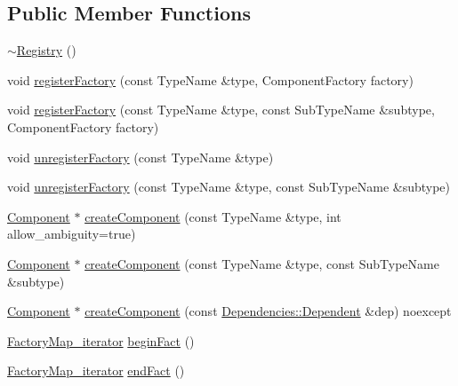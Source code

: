 \subsection*{Public Member Functions}
\begin{DoxyCompactItemize}
\item 
\hyperlink{classtheoria_1_1core_1_1Registry_ac28e339aef39d9d97f1975623c8d8314}{$\sim$\+Registry} ()
\item 
void \hyperlink{classtheoria_1_1core_1_1Registry_ac7cd0cefa7207f2f6c602723cc32ee49}{register\+Factory} (const Type\+Name \&type, Component\+Factory factory)
\item 
void \hyperlink{classtheoria_1_1core_1_1Registry_a861b9906b6e10bdebc74ec7397ea971a}{register\+Factory} (const Type\+Name \&type, const Sub\+Type\+Name \&subtype, Component\+Factory factory)
\item 
void \hyperlink{classtheoria_1_1core_1_1Registry_a07940fe9f04fa89130432610d02aa0df}{unregister\+Factory} (const Type\+Name \&type)
\item 
void \hyperlink{classtheoria_1_1core_1_1Registry_aabfbd64902458b12cfd7bd20cf400837}{unregister\+Factory} (const Type\+Name \&type, const Sub\+Type\+Name \&subtype)
\item 
\hyperlink{classtheoria_1_1core_1_1Component}{Component} $\ast$ \hyperlink{classtheoria_1_1core_1_1Registry_a846b6ea01b2c4d3d1276796e9ef2b32b}{create\+Component} (const Type\+Name \&type, int allow\+\_\+ambiguity=true)
\item 
\hyperlink{classtheoria_1_1core_1_1Component}{Component} $\ast$ \hyperlink{classtheoria_1_1core_1_1Registry_a22ddcd3c1f46bd171cb9d704889a8a07}{create\+Component} (const Type\+Name \&type, const Sub\+Type\+Name \&subtype)
\item 
\hyperlink{classtheoria_1_1core_1_1Component}{Component} $\ast$ \hyperlink{classtheoria_1_1core_1_1Registry_aab152e6e19be2b33f13bb82e77aca917}{create\+Component} (const \hyperlink{structtheoria_1_1core_1_1Dependencies_1_1Dependent}{Dependencies\+::\+Dependent} \&dep) noexcept
\item 
\hyperlink{classtheoria_1_1core_1_1Registry_ae131721f32d396fad4d2d48b0438dca1}{Factory\+Map\+\_\+iterator} \hyperlink{classtheoria_1_1core_1_1Registry_a0a7c747a611355e212e026e128acd322}{begin\+Fact} ()
\item 
\hyperlink{classtheoria_1_1core_1_1Registry_ae131721f32d396fad4d2d48b0438dca1}{Factory\+Map\+\_\+iterator} \hyperlink{classtheoria_1_1core_1_1Registry_ac88948c696663ae6f7ba3ece5c2fdcc9}{end\+Fact} ()
\item 

\end{DoxyCompactItemize}
